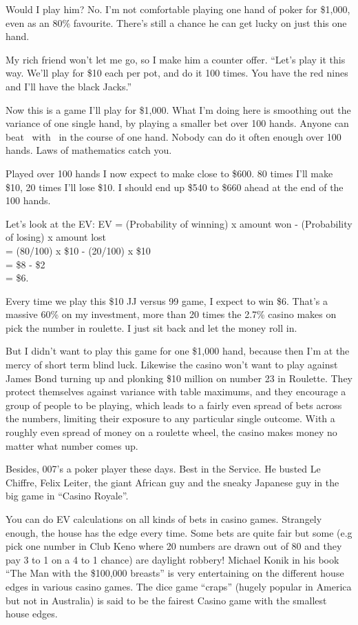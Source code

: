 Would I play him? No. I'm not comfortable playing one hand of poker
for \$1,000, even as an 80\% favourite. There's still a chance he can get
lucky on just this one hand.

My rich friend won't let me go, so I make him a counter offer.
``Let's play it this way. We'll play for \$10 each per pot, and do
it 100 times. You have the red nines and I'll have the black Jacks.''

Now this is a game I'll play for \$1,000. What I'm doing here is smoothing
out the variance of one single hand, by playing a smaller bet over
100 hands. Anyone can beat \Jc\Js\ with \nineh\nined\ in the course of one
hand. Nobody can do it often enough over 100 hands. Laws of mathematics
catch you.

Played over 100 hands I now expect to make close to \$600. 80 times I'll
make \$10, 20 times I'll lose \$10. I should end up \$540 to \$660 ahead
at the end of the 100 hands.

Let's look at the EV:
EV = (Probability of winning) x amount won - (Probability of losing) x amount lost \\
   = (80/100) x \$10 - (20/100) x \$10 \\
   = \$8 - \$2 \\
   = \$6.

Every time we play this \$10 JJ versus 99 game, I expect to win \$6. That's a
massive 60\% on my investment, more than 20 times the 2.7\% casino makes on
pick the number in roulette. I just sit back and let the money roll in.

But I didn't want to play this game for one \$1,000 hand, because then
I'm at the mercy of short term blind luck. Likewise the casino won't
want to play against James Bond turning up and plonking \$10 million
on number 23 in Roulette. They protect themselves against variance
with table maximums, and they encourage a group of people to be playing,
which leads to a fairly even spread of bets across the numbers, limiting
their exposure to any particular single outcome. With a roughly even spread
of money on a roulette wheel, the casino makes money no matter what
number comes up.

Besides, 007's a poker player these days. Best in the Service.
He busted Le Chiffre, Felix Leiter, the giant African guy and
the sneaky Japanese guy in the big game in ``Casino Royale''.

You can do EV calculations on all kinds of bets in casino games.
Strangely enough, the house has the edge every time. Some bets
are quite fair but some (e.g pick one number in Club Keno
where 20 numbers are drawn out of 80 and they pay
3 to 1 on a 4 to 1 chance) are daylight robbery! Michael Konik
in his book ``The Man with the \$100,000 breasts'' is very entertaining on the
different house edges in various casino games. The dice game ``craps''
(hugely popular in America but not in Australia) is said to be
the fairest Casino game with the smallest house edges.

